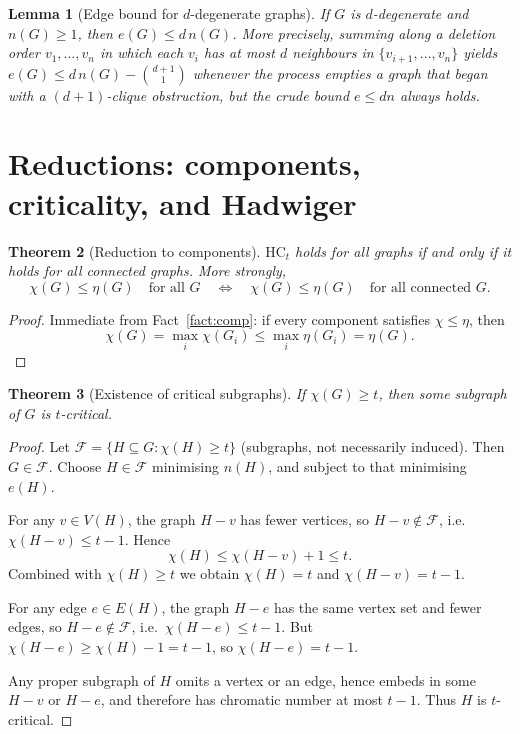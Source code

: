 \documentclass[11pt]{article}
\newtheorem{theorem}{Theorem}[section]
\newtheorem{lemma}[theorem]{Lemma}
\theoremstyle{definition}
\newcommand{\had}{\eta}
\begin{document}
\begin{lemma}[Edge bound for \(d\)-degenerate graphs]\label{lem:degen-edges}
If \(G\) is \(d\)-degenerate and \(n(G)\ge 1\), then \(e(G)\le d\,n(G)\). More
precisely, summing along a deletion order \(v_1,\dots,v_n\) in which each \(v_i\)
has at most \(d\) neighbours in \(\{v_{i+1},\dots,v_n\}\) yields
\(e(G)\le d\,n(G)-\binom{d+1}{1}\) whenever the process empties a graph that began
with a \((d+1)\)-clique obstruction, but the crude bound \(e\le dn\) always holds.
\end{lemma}

\section{Reductions: components, criticality, and Hadwiger}

\begin{theorem}[Reduction to components]\label{thm:components}
\(\mathrm{HC}_t\) holds for all graphs if and only if it holds for all connected
graphs. More strongly,
\[
\chi(G)\le\had(G)\quad\text{for all \(G\)}
\quad\Longleftrightarrow\quad
\chi(G)\le\had(G)\quad\text{for all connected \(G\)}.
\]
\end{theorem}

\begin{proof}
Immediate from Fact~\ref{fact:comp}: if every component satisfies
\(\chi\le\had\), then
\[
\chi(G)=\max_i\chi(G_i)\le\max_i\had(G_i)=\had(G).
\]
\end{proof}

\begin{theorem}[Existence of critical subgraphs]\label{thm:crit-exist}
If \(\chi(G)\ge t\), then some subgraph of \(G\) is \(t\)-critical.
\end{theorem}

\begin{proof}
Let \(\mathcal F=\{H\subseteq G:\chi(H)\ge t\}\) (subgraphs, not necessarily
induced). Then \(G\in\mathcal F\). Choose \(H\in\mathcal F\) minimising
\(n(H)\), and subject to that minimising \(e(H)\).

For any \(v\in V(H)\), the graph \(H-v\) has fewer vertices, so
\(H-v\notin\mathcal F\), i.e.\ \(\chi(H-v)\le t-1\). Hence
\[
\chi(H)\le\chi(H-v)+1\le t.
\]
Combined with \(\chi(H)\ge t\) we obtain \(\chi(H)=t\) and \(\chi(H-v)=t-1\).

For any edge \(e\in E(H)\), the graph \(H-e\) has the same vertex set and fewer
edges, so \(H-e\notin\mathcal F\), i.e.\ \(\chi(H-e)\le t-1\). But
\(\chi(H-e)\ge\chi(H)-1=t-1\), so \(\chi(H-e)=t-1\).

Any proper subgraph of \(H\) omits a vertex or an edge, hence embeds in some
\(H-v\) or \(H-e\), and therefore has chromatic number at most \(t-1\). Thus
\(H\) is \(t\)-critical.
\end{proof}
\end{document}
